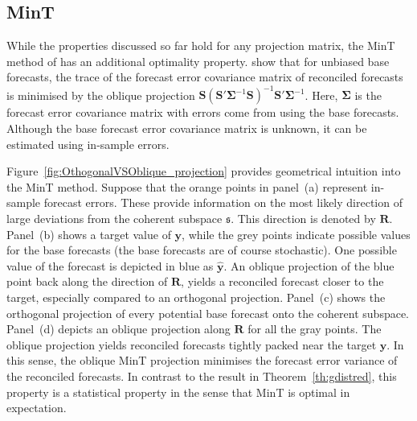 \documentclass[12pt]{article}
\theoremstyle{definition}
\begin{document}
\subsection{MinT}

While the properties discussed so far hold for any projection matrix, the MinT method of \citet{WicEtAl2019} has an additional optimality property. \citet{WicEtAl2019} show that for unbiased base forecasts, the trace of the forecast error covariance matrix of reconciled forecasts is minimised by the oblique projection {\color{blue} $\bm{S}\left(\bm{S}'\bm{\Sigma}^{-1}\bm{S}\right)^{-1}\bm{S}'\bm{\Sigma}^{-1}$}. Here, {\color{blue}$\bm{\Sigma}$} is the forecast error covariance matrix with errors come from using the base forecasts. Although the base forecast error covariance matrix is unknown, it can be estimated using in-sample errors.

Figure~\ref{fig:OthogonalVSOblique_projection} provides geometrical intuition into the MinT method. Suppose that the orange points in panel~(a) represent in-sample forecast errors. These provide information on the most likely direction of large deviations from the coherent subspace $\mathfrak{s}$. This direction is denoted by $\bm{R}$. Panel~(b) shows a target value of $\bm{y}$, while the grey points indicate possible values for the base forecasts (the base forecasts are of course stochastic). One possible value of the forecast is depicted in blue as $\hat{\bm{y}}$. An oblique projection of the blue point back along the direction of $\bm{R}$, yields a reconciled forecast closer to the target, especially compared to an orthogonal projection. Panel~(c) shows the orthogonal projection of every potential base forecast onto the coherent subspace. Panel~(d) depicts an oblique projection along $\bm{R}$ for all the gray points. The oblique projection yields reconciled forecasts tightly packed near the target $\bm{y}$. In this sense, the oblique MinT projection minimises the forecast error variance of the reconciled forecasts. In contrast to the result in Theorem~\ref{th:gdistred}, this property is a statistical property in the sense that MinT is optimal in expectation.
\end{document}
